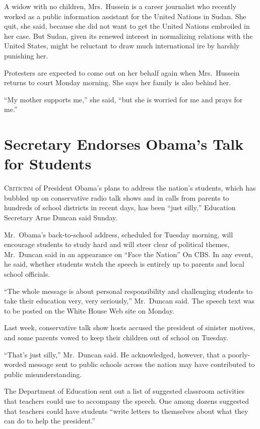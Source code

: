 ﻿\documentclass[12pt]{article}
\begin{document}
A widow with no children, Mrs.~Hussein is a career journalist who recently worked as a public
information assistant for the United Nations in Sudan. She quit, she said, because she did not want
to get the United Nations embroiled in her case. But Sudan, given its renewed interest in
normalizing relations with the United States, might be reluctant to draw much international ire by
harshly punishing her.

Protesters are expected to come out on her behalf again when Mrs.~Hussein returns to court Monday
morning. She says her family is also behind her.

``My mother supports me,'' she said, ``but she is worried for me and prays for me.''

\section{Secretary Endorses Obama's Talk for Students}

\lettrine{C}{riticism} of President Obama's plans to address the nation's students, which has
bubbled up on conservative radio talk shows and in calls from parents to hundreds of school
districts in recent days, has been ``just silly,'' Education Secretary Arne Duncan said Sunday.

Mr.~Obama's back-to-school address, scheduled for Tuesday morning, will encourage students to study
hard and will steer clear of political themes, Mr.~Duncan said in an appearance on ``Face the
Nation'' On CBS. In any event, he said, whether students watch the speech is entirely up to parents
and local school officials.

``The whole message is about personal responsibility and challenging students to take their
education very, very seriously,'' Mr.~Duncan said. The speech text was to be posted on the White
House Web site on Monday.

Last week, conservative talk show hosts accused the president of sinister motives, and some parents
vowed to keep their children out of school on Tuesday.

``That's just silly,'' Mr.~Duncan said. He acknowledged, however, that a poorly-worded message sent
to public schools across the nation may have contributed to public misunderstanding.

The Department of Education sent out a list of suggested classroom activities that teachers could
use to accompany the speech. One among dozens suggested that teachers could have students ``write
letters to themselves about what they can do to help the president.''
\end{document}
